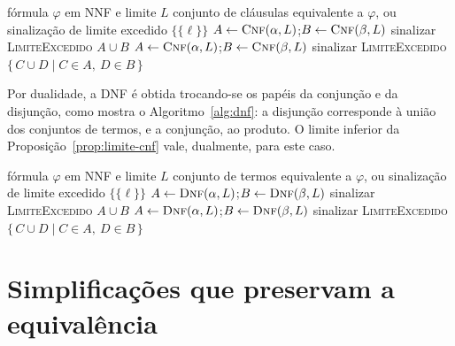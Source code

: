 \documentclass[12pt,a4paper,oneside]{report}
\theoremstyle{tituloplain}
\theoremstyle{titulodef}
\begin{document}
\begin{algorithm}[htbp]
\caption{CNF por distributividade, a partir de uma NNF}\label{alg:cnf}
\begin{algorithmic}[1]
\Require fórmula $\varphi$ em NNF e limite $L$
\Ensure conjunto de cláusulas equivalente a $\varphi$, ou sinalização de limite excedido
    \State \Return $\{\{\ell\}\}$
  \ElsIf{$\varphi=\alpha\wedge\beta$}
    \State $A\gets\textsc{Cnf}(\alpha,L)$;\quad $B\gets\textsc{Cnf}(\beta,L)$
     \State sinalizar \textsc{LimiteExcedido} \EndIf
    \State \Return $A\cup B$
  \ElsIf{$\varphi=\alpha\vee\beta$}
    \State $A\gets\textsc{Cnf}(\alpha,L)$;\quad $B\gets\textsc{Cnf}(\beta,L)$
     \State sinalizar \textsc{LimiteExcedido} \EndIf
    \State \Return $\{\,C\cup D \mid C\in A,\ D\in B\,\}$
  \EndIf
\EndFunction
\end{algorithmic}
\end{algorithm}

Por dualidade, a DNF é obtida trocando-se os papéis da conjunção e da disjunção, como mostra o Algoritmo~\ref{alg:dnf}: a disjunção corresponde à união dos conjuntos de termos, e a conjunção, ao produto. O limite inferior da Proposição~\ref{prop:limite-cnf} vale, dualmente, para este caso.

\begin{algorithm}[htbp]
\caption{DNF por distributividade, a partir de uma NNF}\label{alg:dnf}
\begin{algorithmic}[1]
\Require fórmula $\varphi$ em NNF e limite $L$
\Ensure conjunto de termos equivalente a $\varphi$, ou sinalização de limite excedido
    \State \Return $\{\{\ell\}\}$
  \ElsIf{$\varphi=\alpha\vee\beta$}
    \State $A\gets\textsc{Dnf}(\alpha,L)$;\quad $B\gets\textsc{Dnf}(\beta,L)$
     \State sinalizar \textsc{LimiteExcedido} \EndIf
    \State \Return $A\cup B$
  \ElsIf{$\varphi=\alpha\wedge\beta$}
    \State $A\gets\textsc{Dnf}(\alpha,L)$;\quad $B\gets\textsc{Dnf}(\beta,L)$
     \State sinalizar \textsc{LimiteExcedido} \EndIf
    \State \Return $\{\,C\cup D \mid C\in A,\ D\in B\,\}$
  \EndIf
\EndFunction
\end{algorithmic}
\end{algorithm}

\section{Simplificações que preservam a equivalência}
\end{document}
